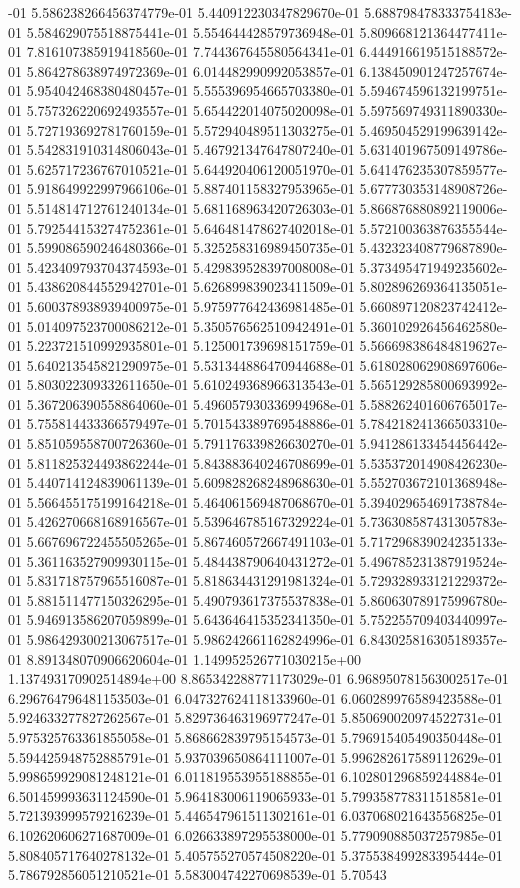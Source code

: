 -01	5.586238266456374779e-01	5.440912230347829670e-01	5.688798478333754183e-01	5.584629075518875441e-01	5.554644428579736948e-01	5.809668121364477411e-01	7.816107385919418560e-01	7.744367645580564341e-01	6.444916619515188572e-01	5.864278638974972369e-01	6.014482990992053857e-01	6.138450901247257674e-01	5.954042468380480457e-01	5.555396954665703380e-01	5.594674596132199751e-01	5.757326220692493557e-01	5.654422014075020098e-01	5.597569749311890330e-01	5.727193692781760159e-01	5.572940489511303275e-01	5.469504529199639142e-01	5.542831910314806043e-01	5.467921347647807240e-01	5.631401967509149786e-01	5.625717236767010521e-01	5.644920406120051970e-01	5.641476235307859577e-01	5.918649922997966106e-01	5.887401158327953965e-01	5.677730353148908726e-01	5.514814712761240134e-01	5.681168963420726303e-01	5.866876880892119006e-01	5.792544153274752361e-01	5.646481478627402018e-01	5.572100363876355544e-01	5.599086590246480366e-01	5.325258316989450735e-01	5.432323408779687890e-01	5.423409793704374593e-01	5.429839528397008008e-01	5.373495471949235602e-01	5.438620844552942701e-01	5.626899839023411509e-01	5.802896269364135051e-01	5.600378938939400975e-01	5.975977642436981485e-01	5.660897120823742412e-01	5.014097523700086212e-01	5.350576562510942491e-01	5.360102926456462580e-01	5.223721510992935801e-01	5.125001739698151759e-01	5.566698386484819627e-01	5.640213545821290975e-01	5.531344886470944688e-01	5.618028062908697606e-01	5.803022309332611650e-01	5.610249368966313543e-01	5.565129285800693992e-01	5.367206390558864060e-01	5.496057930336994968e-01	5.588262401606765017e-01	5.755814433366579497e-01	5.701543389769548886e-01	5.784218241366503310e-01	5.851059558700726360e-01	5.791176339826630270e-01	5.941286133454456442e-01	5.811825324493862244e-01	5.843883640246708699e-01	5.535372014908426230e-01	5.440714124839061139e-01	5.609828268248968630e-01	5.552703672101368948e-01	5.566455175199164218e-01	5.464061569487068670e-01	5.394029654691738784e-01	5.426270668168916567e-01	5.539646785167329224e-01	5.736308587431305783e-01	5.667696722455505265e-01	5.867460572667491103e-01	5.717296839024235133e-01	5.361163527909930115e-01	5.484438790640431272e-01	5.496785231387919524e-01	5.831718757965516087e-01	5.818634431291981324e-01	5.729328933121229372e-01	5.881511477150326295e-01	5.490793617375537838e-01	5.860630789175996780e-01	5.946913586207059899e-01	5.643646415352341350e-01	5.752255709403440997e-01	5.986429300213067517e-01	5.986242661162824996e-01	6.843025816305189357e-01	8.891348070906620604e-01	1.149952526771030215e+00	1.137493170902514894e+00	8.865342288771173029e-01	6.968950781563002517e-01	6.296764796481153503e-01	6.047327624118133960e-01	6.060289976589423588e-01	5.924633277827262567e-01	5.829736463196977247e-01	5.850690020974522731e-01	5.975325763361855058e-01	5.868662839795154573e-01	5.796915405490350448e-01	5.594425948752885791e-01	5.937039650864111007e-01	5.996282617589112629e-01	5.998659929081248121e-01	6.011819553955188855e-01	6.102801296859244884e-01	6.501459993631124590e-01	5.964183006119065933e-01	5.799358778311518581e-01	5.721393999579216239e-01	5.446547961511302161e-01	6.037068021643556825e-01	6.102620606271687009e-01	6.026633897295538000e-01	5.779090885037257985e-01	5.808405717640278132e-01	5.405755270574508220e-01	5.375538499283395444e-01	5.786792856051210521e-01	5.583004742270698539e-01	5.70543